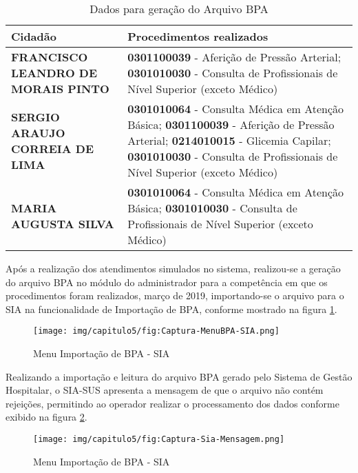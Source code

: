 \begin{longtable}[c]{|p{15em}|p{20em}|}
\caption{Dados para geração do Arquivo BPA\label{dadosValidacao}}
\\

\hline
\textbf{Cidadão} & \textbf{Procedimentos realizados}\\
\hline
\endfirsthead
\endhead
\hline
\endfoot
\endlastfoot
    \textbf{FRANCISCO LEANDRO DE MORAIS PINTO} &  \textbf{0301100039} - Aferição de Pressão Arterial;
    \textbf{0301010030} - Consulta de Profissionais de Nível Superior (exceto Médico)\\
    \hline
    \textbf{SERGIO ARAUJO CORREIA DE LIMA} & \textbf{0301010064} - Consulta Médica em Atenção Básica;
    \textbf{0301100039} - Aferição de Pressão Arterial;
    \textbf{0214010015} - Glicemia Capilar; \textbf{0301010030} - Consulta de Profissionais de Nível Superior (exceto Médico) \\
    \hline
    \textbf{MARIA AUGUSTA SILVA} & \textbf{0301010064} - Consulta Médica em Atenção Básica;
    \textbf{0301010030} - Consulta de Profissionais de Nível Superior (exceto Médico)\\
    \hline
\end{longtable}

Após a realização dos atendimentos simulados no sistema, realizou-se a geração do arquivo BPA no módulo do administrador para a competência em que os procedimentos foram realizados, março de 2019, importando-se o arquivo para o SIA na funcionalidade de Importação de BPA, conforme mostrado na figura \ref{fig:Captura-MenuBPA-SIA}.

\begin{figure}[H]
    \centering
     \caption{Menu Importação de BPA - SIA}
    \texttt{[image: img/capitulo5/fig:Captura-MenuBPA-SIA.png]}
    \label{fig:Captura-MenuBPA-SIA}
\end{figure}

Realizando a importação e leitura do arquivo BPA gerado pelo Sistema de Gestão Hospitalar, o SIA-SUS apresenta a mensagem de que o arquivo não contém rejeições, permitindo ao operador realizar o processamento dos dados conforme exibido na figura \ref{fig:Captura-MensagemSIA}.

\begin{figure}[H]
    \centering
     \caption{Menu Importação de BPA - SIA}
    \texttt{[image: img/capitulo5/fig:Captura-Sia-Mensagem.png]}
    \label{fig:Captura-MensagemSIA}
\end{figure}

